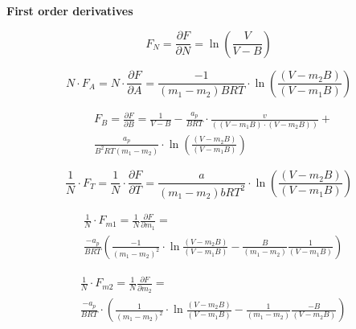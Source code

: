 \documentclass[a4paper, 12pt, english, sintefheadings, sintefcolour]{sintefmemo}
\begin{document}
\textbf{First order derivatives}\\

\noindent\hrulefill

\begin{equation}
F_N=\frac{\partial F}{\partial N}=\ln\left(\frac{V}{V-B}\right)
\end{equation}

\noindent\hrulefill


\begin{equation}
N\cdot F_A=N\cdot\frac{\partial F}{\partial A}=\frac{-1}{(m_1-m_2)BRT}\cdot\ln\left(\frac{(V-m_2B)}{(V-m_1B)}\right)
\end{equation}

\noindent\hrulefill

\begin{equation}
\begin{split}
&F_B=\frac{\partial F}{\partial B}=\frac{1}{V-B}-\frac{a_p}{BRT}\cdot\frac{v}{\left((V-m_1B)\cdot(V-m_2B)\right)}+\\
&\frac{a_p}{B^2RT\left(m_1-m_2\right)}\cdot\ln\left(\frac{(V-m_2B)}{(V-m_1B)}\right)
\end{split}
\end{equation}

\noindent\hrulefill

\begin{equation}
\frac{1}{N}\cdot F_T = \frac{1}{N}\cdot\frac{\partial F}{\partial T}=\frac{a}{(m_1-m_2)bRT^2}\cdot\ln{\left(\frac{(V-m_2B)}{(V-m_1B)}\right)}
\end{equation}

\noindent\hrulefill

\begin{equation}
\begin{split}
&\frac{1}{N}\cdot F_{m1}=\frac{1}{N}\frac{\partial F}{\partial m_1}= \\
&\frac{-a_p}{BRT}\left(\frac{-1}{(m_1-m_2)^2}\cdot\ln{\frac{(V-m_2B)}{(V-m_1B)}}-\frac{B}{(m_1-m_2)}\frac{1}{(V-m_1B)}\right)
\end{split}
\end{equation}

\noindent\hrulefill

\begin{equation}
\begin{split}
&\frac{1}{N}\cdot F_{m2}=\frac{1}{N}\frac{\partial F}{\partial m_2}=\\
&\frac{-a_p}{BRT}\cdot\left(\frac{1}{(m_1-m_2)^2}\cdot\ln{\frac{(V-m_2B)}{(V-m_1B)}}-\frac{1}{(m_1-m_2)}\frac{-B}{(V-m_2B)}\right)
\end{split}
\end{equation}
\end{document}
